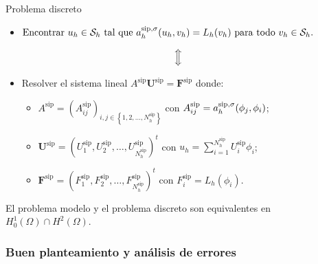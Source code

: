 \begin{frame}{Problema discreto}

\begin{itemize}
\item $\text{Encontrar }u_h\in\mathcal{S}_h\text{ tal que }a_h^{\text{sip},\sigma}(u_h,v_h)=L_h(v_h)\text{ para todo }v_h\in\mathcal{S}_h.$
\end{itemize}
\vspace*{0.1cm}
$$\Big{\Updownarrow}$$
\vspace*{-0.3cm}
\begin{itemize}
\item Resolver el sistema lineal $A^{\text{sip}}\mathbf{U}^{\text{sip}}=\mathbf{F}^{\text{sip}}$ donde:
\vspace*{0.3cm}
\begin{itemize}
	\item $A^{\text{sip}}=\left(A_{ij}^{\text{sip}}\right)_{i,j\in\left\{1,2,\ldots,N_h^{\text{sip}}\right\}}$ con $A_{ij}^{\text{sip}}=a_h^{\text{sip},\sigma}(\phi_j,\phi_i)$;
	\item $\mathbf{U}^{\text{sip}}=\left(U_1^{\text{sip}},U_2^{\text{sip}},\ldots,U_{N_h^{\text{sip}}}^{\text{sip}}\right)^t$ con $u_h=\displaystyle\sum_{i=1}^{N_h^{\text{sip}}}U_i^{\text{sip}}\phi_i$;
	\item $\mathbf{F}^{\text{sip}}=\left(F_1^{\text{sip}},F_2^{\text{sip}},\ldots,F_{N_h^{\text{sip}}}^{\text{sip}}\right)^t$ con $F_i^{\text{sip}}=L_h(\phi_i)$.
\end{itemize}
\end{itemize}

\vspace*{0.3cm}
El problema modelo y el problema discreto son \alert{equivalentes} en $H_0^1(\Omega)\cap H^2(\Omega)$.

\end{frame}

\subsubsection{Buen planteamiento y análisis de errores}

